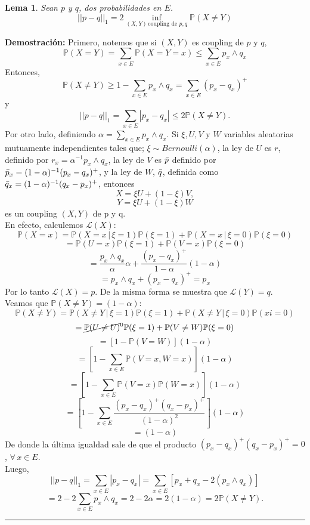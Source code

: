 \documentclass[a4paper]{article}
\newcommand{\prob}{\mathbb{P}}
\newtheorem{lem}{Lema}
\numberwithin{equation}{subsection}
\begin{document}
\begin{lem}
Sean $p$ y $q$, dos probabilidades en $E$. 
\[||p-q||_1 = 2 \inf_{(X,Y)\,\text{coupling de }p,q}\prob(X\neq Y)\]
\end{lem}

\textbf{Demostración: }Primero, notemos que  si $(X,Y)$ es coupling de $p$ y $q$,
\[\prob(X=Y)=\sum_{x\in E}\prob(X=Y=x) \leq \sum_{x\in E}p_x\wedge q_x\]
Entonces,
\[\prob(X\neq Y)\geq 1- \sum_{x \in E}p_x\wedge q_x = \sum_{x\in E}(p_x-q_x)^{+}\]
y
\[||p-q||_1 = \sum_{x\in E}|p_x-q_x| \leq 2\prob(X\neq Y).\]
Por otro lado, definiendo $\alpha = \sum_{x \in E}p_x\wedge q_x$. Si $\xi, U,V$ y $W$ variables aleatorias mutuamente independientes tales que; $\xi \sim Bernoulli(\alpha)$, la ley de $U$ es $r$, definido por $r_x=\alpha^{-1}p_x\wedge q_x$, la ley de $V$ es $\Bar{p}$ definido por $\Bar{p}_x = (1-\alpha)^{-1}(p_x-q_x)^{+}$, y la ley de $W$, $\Bar{q}$, definida como $\Bar{q}_x = (1-\alpha)^{-1}(q_x-p_x)^{+}$, entonces 
\[X= \xi U + (1-\xi)V,\]
\[Y =\xi U +(1-\xi)W\]
es un coupling $(X,Y)$ de p y q.\\ En efecto, calculemos $\mathcal{L}(X)$:
\[\prob(X=x) = \prob(X=x\,|\,\xi=1)\prob(\xi = 1) + \prob(X=x\,|\,\xi=0)\prob(\xi=0)\]
\[= \prob(U=x)\prob(\xi = 1) + \prob(V=x)\prob(\xi=0)\]
\[= \frac{p_x\wedge q_x}{\alpha}\alpha + \frac{(p_x - q_x)^{+}}{1-\alpha}(1-\alpha)\]
\[= p_x\wedge q_x + (p_x -q_x)^{+} = p_x\]
Por lo tanto $\mathcal{L}(X) = p$. De la misma forma se muestra que $\mathcal{L}(Y) = q$.\\ \newline
Veamos que $\prob(X\neq Y) = (1-\alpha)$:
\[\prob(X\neq Y) = \prob(X\neq Y\,|\,\xi=1)\prob(\xi=1) + \prob(X\neq Y\,|\,\xi=0)\prob(xi=0)\]
\[= \cancel{\prob(U\neq U)}^{0}\prob(\xi=1) + \prob(V\neq W)\prob(\xi =0)\]
\[= \left[ 1-\prob(V=W)\right](1-\alpha)\]
\[= \left[1 - \sum_{x \in E}\prob(V=x,W=x)\right](1-\alpha)\]
\[= \left[1 - \sum_{x \in E}\prob(V=x)\prob(W=x)\right](1-\alpha)\]
\[=\left[ 1- \sum_{x\in E}\frac{(p_x -q_x)^{+}(q_x-p_x)^{+}}{(1-\alpha)^{2}}\right](1-\alpha)\]
\[=(1-\alpha)\]
De donde la última igualdad sale de que el producto $(p_x-q_x)^{+}(q_x-p_x)^{+} = 0$, $\forall\,x\in E$.\\ \newline
Luego, 
\[||p-q||_1 = \sum_{x\in E}|p_x-q_x| = \sum_{x\in E}[p_x+q_x-2(p_x\wedge q_x)]\]
\[= 2 - 2\sum_{x\in E}p_x\wedge q_x = 2-2\alpha = 2(1-\alpha) = 2\prob(X\neq Y).\]
\rule{0.7em}{0.7em}\\ \newline
\end{document}
